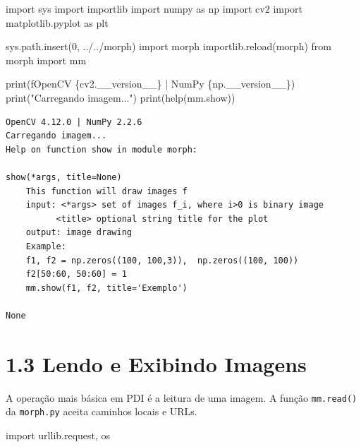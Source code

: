\documentclass[
  portuguese,
  letterpaper,
  openany,
  oneside,
  12pt,
  a4paper]{book}
\newenvironment{Shaded}{\begin{snugshade}}{\end{snugshade}}
\newcommand{\BuiltInTok}[1]{\textcolor[rgb]{0.00,0.23,0.31}{#1}}
\newcommand{\DecValTok}[1]{\textcolor[rgb]{0.68,0.00,0.00}{#1}}
\newcommand{\ImportTok}[1]{\textcolor[rgb]{0.00,0.46,0.62}{#1}}
\newcommand{\NormalTok}[1]{\textcolor[rgb]{0.00,0.23,0.31}{#1}}
\newcommand{\SpecialCharTok}[1]{\textcolor[rgb]{0.37,0.37,0.37}{#1}}
\newcommand{\SpecialStringTok}[1]{\textcolor[rgb]{0.13,0.47,0.30}{#1}}
\newcommand{\StringTok}[1]{\textcolor[rgb]{0.13,0.47,0.30}{#1}}
\begin{document}
\begin{tcolorbox}
\begin{Shaded}
\begin{Highlighting}[]
\ImportTok{import}\NormalTok{ sys}
\ImportTok{import}\NormalTok{ importlib}
\ImportTok{import}\NormalTok{ numpy }\ImportTok{as}\NormalTok{ np}
\ImportTok{import}\NormalTok{ cv2}
\ImportTok{import}\NormalTok{ matplotlib.pyplot }\ImportTok{as}\NormalTok{ plt}

\NormalTok{sys.path.insert(}\DecValTok{0}\NormalTok{, }\StringTok{\textquotesingle{}../../morph\textquotesingle{}}\NormalTok{)}
\ImportTok{import}\NormalTok{ morph}
\NormalTok{importlib.}\BuiltInTok{reload}\NormalTok{(morph)}
\ImportTok{from}\NormalTok{ morph }\ImportTok{import}\NormalTok{ mm}

\BuiltInTok{print}\NormalTok{(}\SpecialStringTok{f\textquotesingle{}OpenCV }\SpecialCharTok{\{}\NormalTok{cv2}\SpecialCharTok{.}\NormalTok{\_\_version\_\_}\SpecialCharTok{\}}\SpecialStringTok{ | NumPy }\SpecialCharTok{\{}\NormalTok{np}\SpecialCharTok{.}\NormalTok{\_\_version\_\_}\SpecialCharTok{\}}\SpecialStringTok{\textquotesingle{}}\NormalTok{)}
\BuiltInTok{print}\NormalTok{(}\StringTok{"Carregando imagem..."}\NormalTok{)}
\BuiltInTok{print}\NormalTok{(}\BuiltInTok{help}\NormalTok{(mm.show))}
\end{Highlighting}
\end{Shaded}

\begin{verbatim}
OpenCV 4.12.0 | NumPy 2.2.6
Carregando imagem...
Help on function show in module morph:

show(*args, title=None)
    This function will draw images f
    input: <*args> set of images f_i, where i>0 is binary image
          <title> optional string title for the plot
    output: image drawing
    Example:
    f1, f2 = np.zeros((100, 100,3)),  np.zeros((100, 100))
    f2[50:60, 50:60] = 1
    mm.show(f1, f2, title='Exemplo')

None
\end{verbatim}

\section{1.3 Lendo e Exibindo Imagens}\label{lendo-e-exibindo-imagens-2}

A operação mais básica em PDI é a leitura de uma imagem. A função
\texttt{mm.read()} da \texttt{morph.py} aceita caminhos locais e URLs.

\begin{Shaded}
\begin{Highlighting}[]
\ImportTok{import}\NormalTok{ urllib.request, os}


\end{Highlighting}
\end{Shaded}
\end{tcolorbox}
\end{document}
